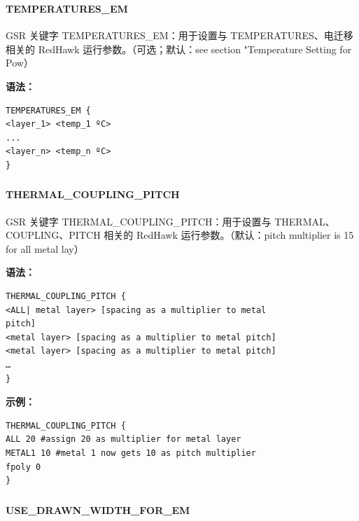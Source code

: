 \subsubsection{}
\paragraph*{TEMPERATURES_EM}

GSR 关键字 TEMPERATURES_EM：用于设置与 TEMPERATURES、电迁移 相关的 RedHawk 运行参数。（可选；默认：see section "Temperature Setting for Pow）

\textbf{语法：}
\begin{lstlisting}
TEMPERATURES_EM {
<layer_1> <temp_1 ºC>
...
<layer_n> <temp_n ºC>
}
\end{lstlisting}

\subsubsection{}
\paragraph*{THERMAL_COUPLING_PITCH}

GSR 关键字 THERMAL_COUPLING_PITCH：用于设置与 THERMAL、COUPLING、PITCH 相关的 RedHawk 运行参数。（默认：pitch multiplier is 15 for all metal lay）

\textbf{语法：}
\begin{lstlisting}
THERMAL_COUPLING_PITCH {
<ALL| metal layer> [spacing as a multiplier to metal
pitch]
<metal layer> [spacing as a multiplier to metal pitch]
<metal layer> [spacing as a multiplier to metal pitch]
…
}
\end{lstlisting}

\textbf{示例：}
\begin{lstlisting}
THERMAL_COUPLING_PITCH {
ALL 20 #assign 20 as multiplier for metal layer
METAL1 10 #metal 1 now gets 10 as pitch multiplier
fpoly 0
}
\end{lstlisting}

\subsubsection{}
\paragraph*{USE_DRAWN_WIDTH_FOR_EM}

